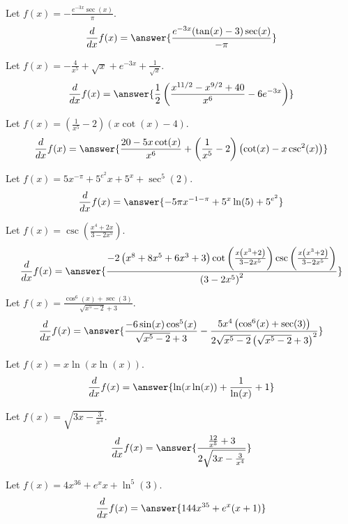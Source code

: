 \documentclass{ximera}
\begin{document}
\begin{shuffle}
\begin{exercise}
Let $f(x)=-\frac{e^{-3 x} \sec (x)}{\pi }$.
\[
\ddx f(x) = \answer{\frac{e^{-3 x} (\tan (x)-3) \sec (x)}{-\pi }}
\]
\end{exercise}

\begin{exercise}
Let $f(x)=-\frac{4}{x^5}+\sqrt{x}+e^{-3 x}+\frac{1}{\sqrt{x}}$.
\[
\ddx f(x) = \answer{\frac{1}{2} \left(\frac{x^{11/2}-x^{9/2}+40}{x^6}-6 e^{-3 x}\right)}
\]
\end{exercise}

\begin{exercise}
Let $f(x)=\left(\frac{1}{x^5}-2\right) (x \cot (x)-4)$.
\[
\ddx f(x) = \answer{\frac{20-5 x \cot (x)}{x^6}+\left(\frac{1}{x^5}-2\right) \left(\cot (x)-x \csc ^2(x)\right)}
\]
\end{exercise}

\begin{exercise}
Let $f(x)=5 x^{-\pi }+5^{e^2} x+5^x+\sec ^5(2)$.
\[
\ddx f(x) = \answer{-5 \pi  x^{-1-\pi }+5^x \ln (5)+5^{e^2}}
\]
\end{exercise}

\begin{exercise}
Let $f(x)=\csc \left(\frac{x^4+2 x}{3-2 x^5}\right)$.
\[
\ddx f(x) = \answer{\frac{-2 \left(x^8+8 x^5+6 x^3+3\right) \cot \left(\frac{x \left(x^3+2\right)}{3-2 x^5}\right) \csc \left(\frac{x \left(x^3+2\right)}{3-2 x^5}\right)}{\left(3-2 x^5\right)^2}}
\]
\end{exercise}

\begin{exercise}
Let $f(x)=\frac{\cos ^6(x)+\sec (3)}{\sqrt{x^5-2}+3}$.
\[
\ddx f(x) = \answer{\frac{-6 \sin (x) \cos ^5(x)}{\sqrt{x^5-2}+3}-\frac{5 x^4 \left(\cos ^6(x)+\sec (3)\right)}{2 \sqrt{x^5-2} \left(\sqrt{x^5-2}+3\right)^2}}
\]
\end{exercise}

\begin{exercise}
Let $f(x)=x \ln (x \ln (x))$.
\[
\ddx f(x) = \answer{\ln (x \ln (x))+\frac{1}{\ln (x)}+1}
\]
\end{exercise}

\begin{exercise}
Let $f(x)=\sqrt{3 x-\frac{3}{x^4}}$.
\[
\ddx f(x) = \answer{\frac{\frac{12}{x^5}+3}{2 \sqrt{3 x-\frac{3}{x^4}}}}
\]
\end{exercise}

\begin{exercise}
Let $f(x)=4 x^{36}+e^x x+\ln ^5(3)$.
\[
\ddx f(x) = \answer{144 x^{35}+e^x (x+1)}
\]
\end{exercise}


\end{shuffle}
\end{document}

